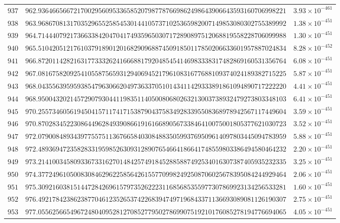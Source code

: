 \documentclass[12pt,reqno]{amsart}
\theoremstyle{remark}
\begin{document}
\begin{longtable}{clc}
$937$ & $962.9364665667217002956095336585207987787669862498643906643593160706998221$ & $3.93\times 10^{-461}$ \\
$938$ & $963.9686708131703529655258545301441057371025365982007149853080302755389992$ & $1.38\times 10^{-451}$ \\
$939$ & $964.7144407921736633842047041749359650307172890897512068819558228706099988$ & $1.30\times 10^{-451}$ \\
$940$ & $965.5104205121761037918901201682909688745091850117850206633601957887024834$ & $8.28\times 10^{-452}$ \\
$941$ & $966.8720114282163177333262416668817920485454146983338317482869160531356764$ & $6.08\times 10^{-451}$ \\
$942$ & $967.0816758209254105587565931294069452179610831677688109374024189382715225$ & $5.87\times 10^{-451}$ \\
$943$ & $968.0435563959593854796306620497363370510143411429333891861094890717222220$ & $4.41\times 10^{-451}$ \\
$944$ & $968.9500432021457290793044119835114050080680263213003738932479273803348103$ & $6.41\times 10^{-451}$ \\
$945$ & $970.2557346056194504157117417153879043758349283395508368978942567117449604$ & $3.59\times 10^{-451}$ \\
$946$ & $970.8702834522308644962849390866191616689056733846410075001805377621030723$ & $3.52\times 10^{-451}$ \\
$947$ & $972.0790084893439775575113676658403084883505993769509614097803445094783959$ & $5.88\times 10^{-451}$ \\
$948$ & $972.4893694723582833195985263093128907654664186641748559803386494580464232$ & $2.20\times 10^{-451}$ \\
$949$ & $973.2141003458093367331627014842574918452885887492534016307387405935232335$ & $3.25\times 10^{-451}$ \\
$950$ & $974.3772496105008308462962258564261557709982492508706025678395084244929464$ & $2.06\times 10^{-451}$ \\
$951$ & $975.3092160381514472842696157973526222311685685355977307869923134256533281$ & $1.60\times 10^{-451}$ \\
$952$ & $976.4921784238623877046123526537422683947497196843371136693089081126190307$ & $2.75\times 10^{-451}$ \\
$953$ & $977.0556256654967248040952812708527795027869907519210176085278194776694065$ & $4.05\times 10^{-451}$ \\

\end{longtable}
\end{document}
